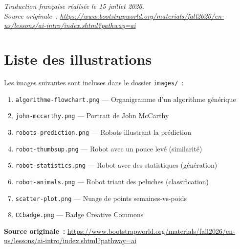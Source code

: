 \documentclass[12pt,a4paper]{article}
\begin{document}
\vspace{1cm}

\begin{center}
  \textit{Traduction française réalisée le 15 juillet 2026.}\\
  \textit{Source originale~: \url{https://www.bootstrapworld.org/materials/fall2026/en-us/lessons/ai-intro/index.shtml?pathway=ai}}
\end{center}

\newpage
\section*{Liste des illustrations}

Les images suivantes sont incluses dans le dossier \texttt{images/}~:

\begin{enumerate}[leftmargin=*]
  \item \texttt{algorithme-flowchart.png} — Organigramme d'un algorithme générique
  \item \texttt{john-mccarthy.png} — Portrait de John McCarthy
  \item \texttt{robots-prediction.png} — Robots illustrant la prédiction
  \item \texttt{robot-thumbsup.png} — Robot avec un pouce levé (similarité)
  \item \texttt{robot-statistics.png} — Robot avec des statistiques (génération)
  \item \texttt{robot-animals.png} — Robot triant des peluches (classification)
  \item \texttt{scatter-plot.png} — Nuage de points semaines-vs-poids
  \item \texttt{CCbadge.png} — Badge Creative Commons
\end{enumerate}

\vspace{1em}
\textbf{Source originale~:} \url{https://www.bootstrapworld.org/materials/fall2026/en-us/lessons/ai-intro/index.shtml?pathway=ai}
\end{document}
